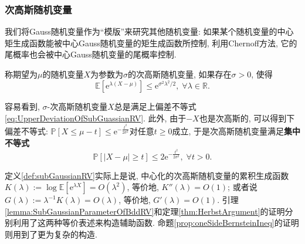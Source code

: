 \subsubsection{次高斯随机变量}

我们将Gauss随机变量作为“模版”来研究其他随机变量: 如果某个随机变量的中心矩生成函数能被中心Gauss随机变量的矩生成函数所控制, 利用Chernoff方法, 它的尾概率也会被中心Gauss随机变量的尾概率控制. 

\begin{definition}[次高斯随机变量]\label{def:subGaussianRV}
	称期望为$\mu$的随机变量$X$为参数为$\sigma$的次高斯随机变量, 如果存在$\sigma > 0$, 使得
	\begin{equation*}
		\mathbb{E}[\mathrm{e}^{\lambda(X - \mu)}] \leq \mathrm{e}^{\sigma^2 \lambda^2 /2},\; \forall \lambda \in \mathbb{R}.   
	\end{equation*}  
\end{definition}
容易看到, $\sigma$-次高斯随机变量$X$总是满足上偏差不等式 \eqref{eq:UpperDeviationOfSubGuassianRV}.  
此外, 由于$-X$也是次高斯的, 可以得到下偏差不等式: $\mathbb{P}[X \leq \mu - t] \leq \mathrm{e}^{- \frac{t^2}{2 \sigma^2}}$对任意$t \geq 0$成立, 于是次高斯随机变量满足\textbf{集中不等式}
\begin{equation}\label{eq:SubGuassianConcentration}
	\mathbb{P}[|X - \mu| \geq t] \leq 2 \mathrm{e}^{- \frac{t^2}{2 \sigma^2}},\; \forall t > 0. 
\end{equation}

\begin{remark}[辅助函数的构造]
	定义\ref{def:subGaussianRV}实际上是说, 中心化的次高斯随机变量的累积生成函数$K(\lambda) := \log \mathbb{E}[\mathrm{e}^{\lambda X}] = O(\lambda^2)$, 等价地, $K''(\lambda) = O(1)$; 
	或者说$G(\lambda) := \lambda^{-1} K(\lambda) = O(\lambda)$, 等价地, $G'(\lambda) = O(1)$. 
	引理\ref{lemma:SubGaussianParameterOfBddRV}和定理\ref{thm:HerbstArgument}的证明分别利用了这两种等价表述来构造辅助函数.
	命题\ref{prop:oneSideBernsteinIneq}的证明则用到了更为复杂的构造.  
\end{remark}

